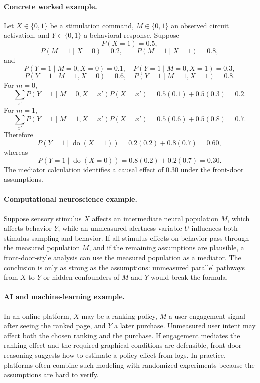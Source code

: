 \paragraph{Concrete worked example.}
Let \(X\in\{0,1\}\) be a stimulation command, \(M\in\{0,1\}\) an observed circuit activation, and \(Y\in\{0,1\}\) a behavioral response. Suppose
\[
P(X=1)=0.5,
\]
\[
P(M=1\mid X=0)=0.2,\qquad P(M=1\mid X=1)=0.8,
\]
and
\[
P(Y=1\mid M=0,X=0)=0.1,\quad P(Y=1\mid M=0,X=1)=0.3,
\]
\[
P(Y=1\mid M=1,X=0)=0.6,\quad P(Y=1\mid M=1,X=1)=0.8.
\]
For \(m=0\),
\[
\sum_{x'}P(Y=1\mid M=0,X=x')P(X=x')
=0.5(0.1)+0.5(0.3)=0.2.
\]
For \(m=1\),
\[
\sum_{x'}P(Y=1\mid M=1,X=x')P(X=x')
=0.5(0.6)+0.5(0.8)=0.7.
\]
Therefore
\[
P(Y=1\mid \operatorname{do}(X=1))
=0.2(0.2)+0.8(0.7)=0.60,
\]
whereas
\[
P(Y=1\mid \operatorname{do}(X=0))
=0.8(0.2)+0.2(0.7)=0.30.
\]
The mediator calculation identifies a causal effect of \(0.30\) under the front-door assumptions.

\paragraph{Computational neuroscience example.}
Suppose sensory stimulus \(X\) affects an intermediate neural population \(M\), which affects behavior \(Y\), while an unmeasured alertness variable \(U\) influences both stimulus sampling and behavior. If all stimulus effects on behavior pass through the measured population \(M\), and if the remaining assumptions are plausible, a front-door-style analysis can use the measured population as a mediator. The conclusion is only as strong as the assumptions: unmeasured parallel pathways from \(X\) to \(Y\) or hidden confounders of \(M\) and \(Y\) would break the formula.

\paragraph{AI and machine-learning example.}
In an online platform, \(X\) may be a ranking policy, \(M\) a user engagement signal after seeing the ranked page, and \(Y\) a later purchase. Unmeasured user intent may affect both the chosen ranking and the purchase. If engagement mediates the ranking effect and the required graphical conditions are defensible, front-door reasoning suggests how to estimate a policy effect from logs. In practice, platforms often combine such modeling with randomized experiments because the assumptions are hard to verify.

